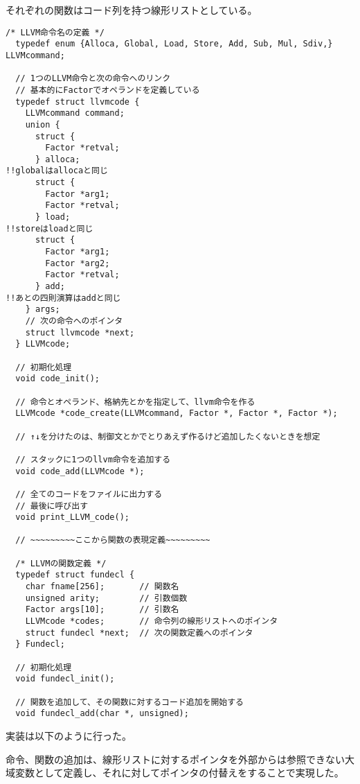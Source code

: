 それぞれの関数はコード列を持つ線形リストとしている。
\begin{lstlisting}[caption={llvm.h},label={llvm.h}]
  /* LLVM命令名の定義 */
  typedef enum {Alloca, Global, Load, Store, Add, Sub, Mul, Sdiv,} LLVMcommand;
  
  // 1つのLLVM命令と次の命令へのリンク
  // 基本的にFactorでオペランドを定義している
  typedef struct llvmcode {
    LLVMcommand command;
    union {
      struct {
        Factor *retval;
      } alloca;
!!globalはallocaと同じ
      struct {
        Factor *arg1;
        Factor *retval;
      } load;
!!storeはloadと同じ
      struct {
        Factor *arg1;
        Factor *arg2;
        Factor *retval;
      } add;
!!あとの四則演算はaddと同じ
    } args;
    // 次の命令へのポインタ
    struct llvmcode *next;
  } LLVMcode;
  
  // 初期化処理
  void code_init();

  // 命令とオペランド、格納先とかを指定して、llvm命令を作る
  LLVMcode *code_create(LLVMcommand, Factor *, Factor *, Factor *);
  
  // ↑↓を分けたのは、制御文とかでとりあえず作るけど追加したくないときを想定
  
  // スタックに1つのllvm命令を追加する
  void code_add(LLVMcode *);
  
  // 全てのコードをファイルに出力する
  // 最後に呼び出す
  void print_LLVM_code();
  
  // ~~~~~~~~~ここから関数の表現定義~~~~~~~~~
  
  /* LLVMの関数定義 */
  typedef struct fundecl {
    char fname[256];       // 関数名
    unsigned arity;        // 引数個数
    Factor args[10];       // 引数名
    LLVMcode *codes;       // 命令列の線形リストへのポインタ
    struct fundecl *next;  // 次の関数定義へのポインタ
  } Fundecl;
  
  // 初期化処理
  void fundecl_init();
  
  // 関数を追加して、その関数に対するコード追加を開始する
  void fundecl_add(char *, unsigned); 
\end{lstlisting}

実装は以下のように行った。

命令、関数の追加は、線形リストに対するポインタを外部からは参照できない大域変数として定義し、それに対してポインタの付替えをすることで実現した。

